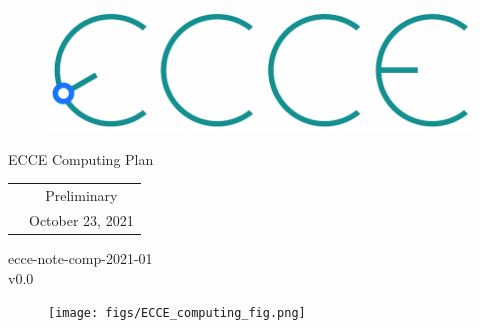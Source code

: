 \renewcommand*\familydefault{\sfdefault}
{\sffamily
\vfill
\vspace{4cm}
\begin{figure}[H]
  \begin{center}
  \includegraphics[width=0.3\linewidth]{figs/ecce-logo.png}
\end{center}
\end{figure}

\begin{center}
  \large
  {\LARGE{ECCE Computing Plan}}

  \begin{tabular}{cc}
& Preliminary
\\
&October 23, 2021 \\
  \end{tabular}
  \end{center}

\vspace{15cm}
\hspace*{0pt}\hfill ecce-note-comp-2021-01 \\
\hspace*{0pt}\hfill v0.0
\vspace{-15cm}

\vspace{1cm}

\begin{figure}[H]
  \begin{center}
    \texttt{[image: figs/ECCE\_computing\_fig.png]}
  \end{center}
\end{figure}
}


\vfill
\renewcommand*\familydefault{\rmdefault}
